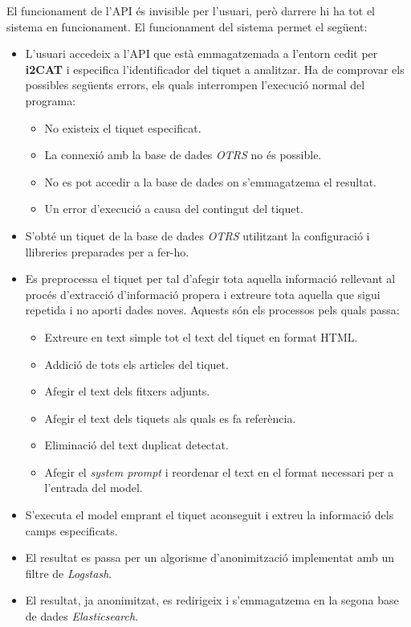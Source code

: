 El funcionament de l'API és invisible per l'usuari, però darrere hi ha tot el sistema en funcionament. El funcionament del sistema permet el següent: 
\begin{itemize}
    \item L'usuari accedeix a l'API que està emmagatzemada a l'entorn cedit per \textbf{i2CAT} i especifica l'identificador del tiquet a analitzar. Ha de comprovar els possibles següents errors, els quals interrompen l'execució normal del programa:
    \begin{itemize}
        \item No existeix el tiquet especificat. 
        \item La connexió amb la base de dades \textit{OTRS} no és possible.
        \item No es pot accedir a la base de dades on s'emmagatzema el resultat.
        \item Un error d'execució a causa del contingut del tiquet.
    \end{itemize}
    \item S'obté un tiquet de la base de dades \textit{OTRS} utilitzant la configuració i llibreries preparades per a fer-ho.
    \item Es preprocessa el tiquet per tal d'afegir tota aquella informació rellevant al procés d'extracció d'informació propera i extreure tota aquella que sigui repetida i no aporti dades noves. Aquests són els processos pels quals passa:
    \begin{itemize}
        \item Extreure en text simple tot el text del tiquet en format HTML.
        \item Addició de tots els articles del tiquet.
        \item Afegir el text dels fitxers adjunts.
        \item Afegir el text dels tiquets als quals es fa referència.
        \item Eliminació del text duplicat detectat.
        \item Afegir el \textit{system prompt} i reordenar el text en el format necessari per a l'entrada del model.
    \end{itemize}
    \item S'executa el model emprant el tiquet aconseguit i extreu la informació dels camps especificats.
    \item El resultat es passa per un algorisme d'anonimització implementat amb un filtre de \textit{Logstash}.
    \item El resultat, ja anonimitzat, es redirigeix i s'emmagatzema en la segona base de dades \textit{Elasticsearch}.
\end{itemize}


